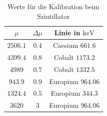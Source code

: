 \documentclass[12pt,a4paper,titlepage]{article}
\begin{document}
\begin{table}
\centering
\begin{tabular}{c|c|c}
$\mu$ & $\Delta \mu$ & Linie in $\si{\kilo\electronvolt}$\\
\hline
$\num{2506.1}$&$\num{0.4}$&Caesium $\num{661.6}$\\
\hline
$\num{4399.4}$&$\num{0.8}$&Cobalt $\num{1173.2}$\\
$\num{4989}$&$\num{0.7}$&Cobalt $\num{1332.5}$\\
\hline
$\num{943.9}$&$\num{0.9}$&Europium $\num{964.06}$\\
$\num{1324.4}$&$\num{0.5}$&Europium $\num{344.3}$\\
$\num{3620}$&$\num{3}$&Europium $\num{964.06}$\\
\end{tabular}
\caption{Werte für die Kalibration beim Szintillator}
\label{tab:sz_kalib}
\end{table}
\end{document}
